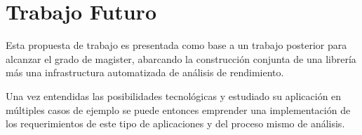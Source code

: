 \documentclass[a4paper]{article}
\begin{document}
\appendix

\section{Trabajo Futuro}

Esta propuesta de trabajo es presentada como base a un trabajo posterior para
alcanzar el grado de magister, abarcando la construcci\'on conjunta de una
librer\'ia m\'as una infrastructura automatizada de an\'alisis de rendimiento.

\smallskip

Una vez entendidas las posibilidades tecnol\'ogicas y estudiado su
aplicaci\'on en m\'ultiples casos de ejemplo se puede entonces emprender una
implementaci\'on de los requerimientos de este tipo de aplicaciones y del
proceso mismo de an\'alisis.
\end{document}
